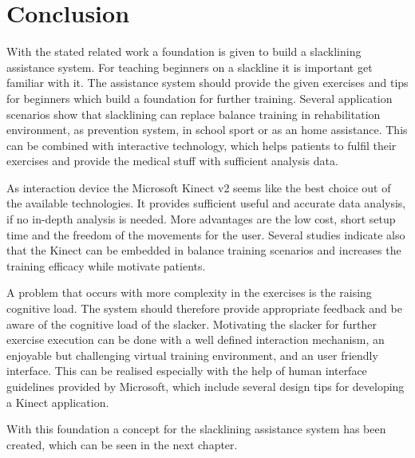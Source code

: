 \section{Conclusion}
With the stated related work a foundation is given to build a slacklining assistance system. For teaching beginners on a slackline it is important get familiar with it. The assistance system should provide the given exercises and tips for beginners which build a foundation for further training.
Several application scenarios show that slacklining can replace balance training in rehabilitation environment, as prevention system, in school sport or as an home assistance. This can be combined with interactive technology, which helps patients to fulfil their exercises and provide the medical stuff with sufficient analysis data.

As interaction device the Microsoft Kinect v2 seems like the best choice out of the available technologies. It provides sufficient useful and accurate data analysis, if no in-depth analysis is needed. More advantages are the low cost, short setup time and the freedom of the movements for the user. Several studies indicate also that the Kinect can be embedded in balance training scenarios and increases the training efficacy while motivate patients.

A problem that occurs with more complexity in the exercises is the raising cognitive load. The system should therefore provide appropriate feedback and be aware of the cognitive load of the slacker. Motivating the slacker for further exercise execution can be done with a well defined interaction mechanism, an enjoyable but challenging virtual training environment, and an user friendly interface. This can be realised especially with the help of human interface guidelines provided by Microsoft, which include several design tips for developing a Kinect application.

With this foundation a concept for the slacklining assistance system has been created, which can be seen in the next chapter.